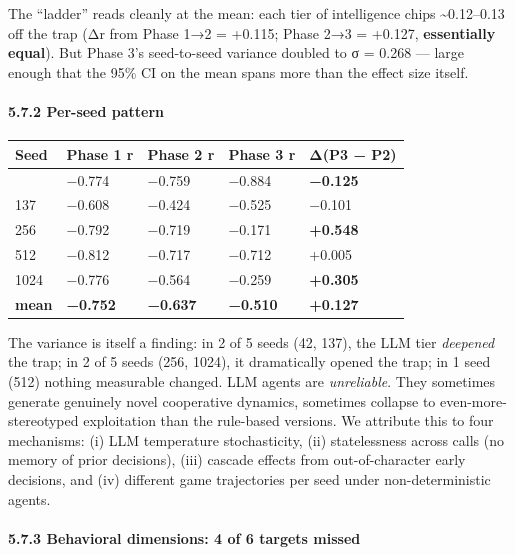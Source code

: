 \documentclass[
]{article}
\begin{document}
The ``ladder'' reads cleanly at the mean: each tier of intelligence
chips \textasciitilde0.12--0.13 off the trap (Δr from Phase 1→2 =
+0.115; Phase 2→3 = +0.127, \textbf{essentially equal}). But Phase 3's
seed-to-seed variance doubled to σ = 0.268 --- large enough that the
95\% CI on the mean spans more than the effect size itself.

\hypertarget{per-seed-pattern}{%
\paragraph{5.7.2 Per-seed pattern}\label{per-seed-pattern}}

\begin{longtable}[]{@{}lllll@{}}
\toprule\noalign{}
Seed & Phase 1 r & Phase 2 r & Phase 3 r & Δ(P3 − P2) \\
\midrule\noalign{}
\endhead
\bottomrule\noalign{}
\endlastfoot
42 & −0.774 & −0.759 & −0.884 & \textbf{−0.125} \\
137 & −0.608 & −0.424 & −0.525 & −0.101 \\
256 & −0.792 & −0.719 & −0.171 & \textbf{+0.548} \\
512 & −0.812 & −0.717 & −0.712 & +0.005 \\
1024 & −0.776 & −0.564 & −0.259 & \textbf{+0.305} \\
\textbf{mean} & \textbf{−0.752} & \textbf{−0.637} & \textbf{−0.510} &
\textbf{+0.127} \\
\end{longtable}

The variance is itself a finding: in 2 of 5 seeds (42, 137), the LLM
tier \emph{deepened} the trap; in 2 of 5 seeds (256, 1024), it
dramatically opened the trap; in 1 seed (512) nothing measurable
changed. LLM agents are \emph{unreliable}. They sometimes generate
genuinely novel cooperative dynamics, sometimes collapse to
even-more-stereotyped exploitation than the rule-based versions. We
attribute this to four mechanisms: (i) LLM temperature stochasticity,
(ii) statelessness across calls (no memory of prior decisions), (iii)
cascade effects from out-of-character early decisions, and (iv)
different game trajectories per seed under non-deterministic agents.

\hypertarget{behavioral-dimensions-4-of-6-targets-missed}{%
\paragraph{5.7.3 Behavioral dimensions: 4 of 6 targets
missed}\label{behavioral-dimensions-4-of-6-targets-missed}}
\end{document}
